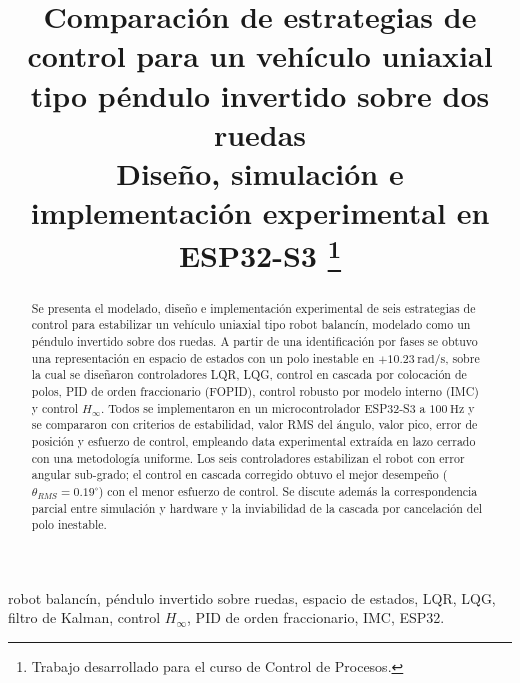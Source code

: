 \documentclass[conference]{IEEEtran}
\begin{document}
\title{Comparaci\'on de estrategias de control para un veh\'iculo uniaxial tipo p\'endulo invertido sobre dos ruedas\\
{\footnotesize Dise\~no, simulaci\'on e implementaci\'on experimental en ESP32-S3}
\thanks{Trabajo desarrollado para el curso de Control de Procesos.}
}

\author{
\and
{}
}

\maketitle

\begin{abstract}
Se presenta el modelado, dise\~no e implementaci\'on experimental de seis
estrategias de control para estabilizar un veh\'iculo uniaxial tipo robot
balanc\'in, modelado como un p\'endulo invertido sobre dos ruedas. A partir de una
identificaci\'on por fases se obtuvo una representaci\'on en espacio de estados con
un polo inestable en $+10.23~\mathrm{rad/s}$, sobre la cual se dise\~naron
controladores LQR, LQG, control en cascada por colocaci\'on de polos, PID de orden
fraccionario (FOPID), control robusto por modelo interno (IMC) y control
$H_\infty$. Todos se implementaron en un microcontrolador ESP32-S3 a
$100~\mathrm{Hz}$ y se compararon con criterios de estabilidad, valor RMS del
\'angulo, valor pico, error de posici\'on y esfuerzo de control, empleando data
experimental extra\'ida en lazo cerrado con una metodolog\'ia uniforme. Los seis
controladores estabilizan el robot con error angular sub-grado; el control en
cascada corregido obtuvo el mejor desempe\~no ($\theta_{RMS}=0.19^\circ$) con el
menor esfuerzo de control. Se discute adem\'as la correspondencia parcial entre
simulaci\'on y hardware y la inviabilidad de la cascada por cancelaci\'on del polo
inestable.
\end{abstract}

\begin{IEEEkeywords}
robot balanc\'in, p\'endulo invertido sobre ruedas, espacio de estados, LQR, LQG,
filtro de Kalman, control $H_\infty$, PID de orden fraccionario, IMC, ESP32.
\end{IEEEkeywords}
\end{document}

